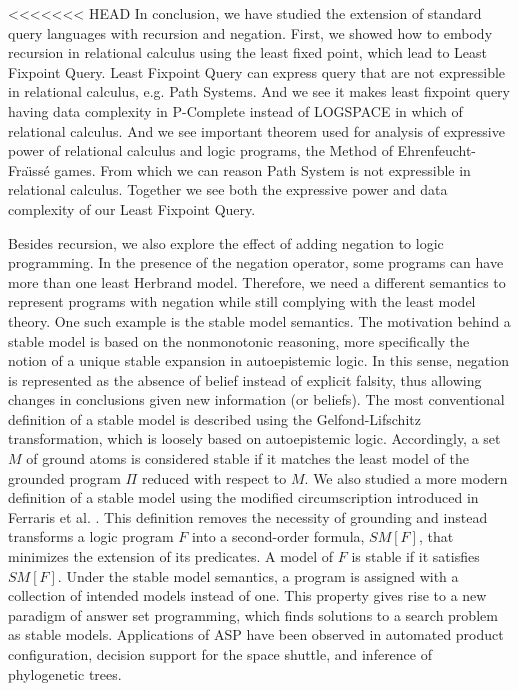 <<<<<<< HEAD
In conclusion, we have studied the extension of standard query languages with recursion and negation. First, we showed how to embody recursion in relational calculus using the least fixed point, which lead to Least Fixpoint Query. Least Fixpoint Query can express query that are not expressible in relational calculus, e.g.  Path Systems. And we see it makes least fixpoint query having data complexity in P-Complete instead of LOGSPACE in which of relational calculus. And we see important theorem used for analysis of expressive power of relational calculus and logic programs, the Method of Ehrenfeucht-Fra\"ıss\'e games. From which we can reason Path System is not expressible in relational calculus. Together we see both the expressive power and data complexity of our Least Fixpoint Query. 

Besides recursion, we also explore the effect of adding negation 
to logic programming. In the presence of the negation operator, 
some programs can have more than one least Herbrand model. Therefore, 
we need a different semantics to represent programs with negation 
while still complying with the least model theory. One such 
example is the stable model semantics. The motivation behind 
a stable model is based on the nonmonotonic reasoning, more 
specifically the notion of a unique stable expansion in 
autoepistemic logic. In this sense, negation is represented as 
the absence of belief instead of explicit falsity, thus allowing 
changes in conclusions given new information (or beliefs). The 
most conventional definition of a stable model is described 
using the Gelfond-Lifschitz transformation, which is loosely based on 
autoepistemic logic. Accordingly, a set $M$ of ground atoms is considered 
stable if it matches the least model of the grounded program $\Pi$ reduced 
with respect to $M$. We also studied a more modern definition of a stable 
model using the modified circumscription introduced in Ferraris et al. \cite{lee}. 
This definition removes the necessity of grounding and instead transforms 
a logic program $F$ into a second-order formula, $SM[F]$, that minimizes the extension of 
its predicates. A model of $F$ is stable if it satisfies $SM[F]$. 
Under the stable model semantics, a program is assigned with a 
collection of intended models instead of one. This property 
gives rise to a new paradigm of answer set programming, 
which finds solutions to a search problem as stable models. Applications 
of ASP have been observed in automated product configuration, decision 
support for the space shuttle, and inference of phylogenetic trees.

